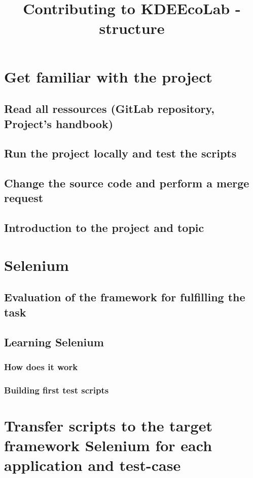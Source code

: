 \documentclass{article}
\title{Contributing to KDEEcoLab - structure}
\begin{document}
\maketitle

\section{Get familiar with the project}
\subsection{Read all ressources (GitLab repository, Project's handbook)}
\subsection{Run the project locally and test the scripts}
\subsection{Change the source code and perform a merge request}
\subsection{Introduction to the project and topic}

\section{Selenium}
\subsection{Evaluation of the framework for fulfilling the task}
\subsection{Learning Selenium}
\subsubsection{How does it work}
\subsubsection{Building first test scripts}

\section{Transfer scripts to the target framework Selenium for each application and test-case}
\end{document}
